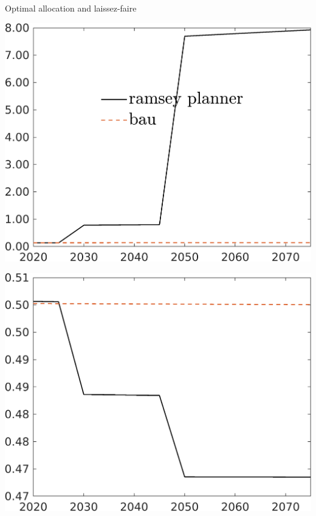 \documentclass[11pt,aspectratio=169]{beamer}
\begin{document}
\begin{frame}{Optimal allocation and laissez-faire}
	\hypertarget{allocLF}{}
	\vspace{-2mm}
	
	\begin{minipage}[]{0.32\textwidth}
		\includegraphics[width=1\textwidth]{../codding_model/own_basedOnFried/optimalPol_elastS_DisuSci/figures/all_1705/GFF_BAUCompOPT_T_NoTaus_spillover0_noskill0_sep1_BN0_ineq0_red0_xgrowth0_etaa0.79_lgd1.png}
	\end{minipage}	
	\begin{minipage}[]{0.32\textwidth}
		\includegraphics[width=1\textwidth]{../codding_model/own_basedOnFried/optimalPol_elastS_DisuSci/figures/all_1705/EY_BAUCompOPT_T_NoTaus_spillover0_noskill0_sep1_BN0_ineq0_red0_xgrowth0_etaa0.79_lgd0.png}

\end{minipage}
\end{frame}
\end{document}
